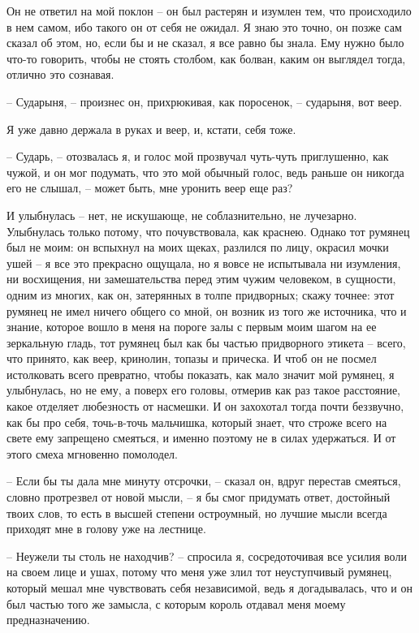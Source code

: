 Он не ответил на мой поклон -- он  был  растерян  и  изумлен  тем,  что
происходило  в нем самом, ибо такого он от себя не ожидал. Я знаю это точно,
он позже сам сказал об этом, но, если бы и не сказал, я все равно бы  знала.
Ему  нужно  было что-то говорить, чтобы не стоять столбом, как болван, каким
он выглядел тогда, отлично это сознавая.

-- Сударыня, -- произнес он, прихрюкивая, как поросенок, --  сударыня,
вот веер.

Я уже давно держала в руках и веер, и, кстати, себя тоже.

-- Сударь,   --   отозвалась   я,   и  голос  мой  прозвучал  чуть-чуть
приглушенно, как чужой, и он мог подумать, что это мой обычный  голос,  ведь
раньше он никогда его не слышал, -- может быть, мне уронить веер еще раз?

И  улыбнулась  --  нет,  не  искушающе,  не  соблазнительно,  не  лучезарно.
Улыбнулась только потому, что почувствовала, как краснею. Однако тот румянец
был не моим: он вспыхнул на моих щеках, разлился по лицу, окрасил мочки ушей
-- я все  это прекрасно ощущала, но  я вовсе не испытывала  ни изумления, ни
восхищения, ни замешательства перед этим  чужим человеком, в сущности, одним
из многих, как он, затерянных в толпе придворных; скажу точнее: этот румянец
не имел ничего общего со мной, он возник из того же источника, что и знание,
которое вошло  в меня на  пороге залы с первым  моим шагом на  ее зеркальную
гладь,  тот румянец  был как  бы частью  придворного этикета  -- всего,  что
принято,  как  веер, кринолин,  топазы  и  прическа.  И  чтоб он  не  посмел
истолковать всего превратно, чтобы показать,  как мало значит мой румянец, я
улыбнулась,  но  не  ему,  а  поверх  его  головы,  отмерив  как  раз  такое
расстояние,  какое отделяет  любезность от  насмешки. И  он захохотал  тогда
почти беззвучно, как бы про  себя, точь-в-точь мальчишка, который знает, что
строже всего  на свете ему запрещено  смеяться, и именно поэтому  не в силах
удержаться. И от этого смеха мгновенно помолодел.

-- Если бы ты дала мне минуту отсрочки, -- сказал  он,  вдруг  перестав
смеяться,  словно  протрезвел  от новой мысли, -- я бы смог придумать ответ,
достойный твоих слов, то есть в высшей степени остроумный, но  лучшие  мысли
всегда приходят мне в голову уже на лестнице.

-- Неужели  ты  столь  не  находчив?  -- спросила я, сосредоточивая все
усилия воли на своем лице и ушах, потому что меня уже злил тот  неуступчивый
румянец,   который   мешал   мне   чувствовать   себя  независимой,  ведь  я
догадывалась, что и он был частью того же замысла, с которым король  отдавал
меня моему предназначению.

